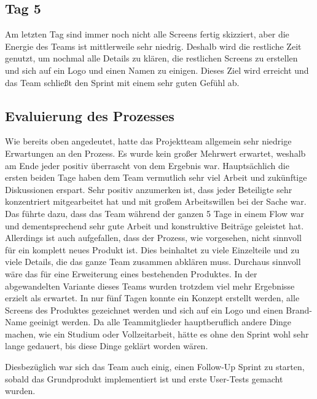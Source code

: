 \subsection*{Tag 5}
Am letzten Tag sind immer noch nicht alle Screens fertig skizziert, aber die Energie des Teams ist mittlerweile sehr niedrig. Deshalb wird die restliche Zeit genutzt, um nochmal alle Details zu klären, die restlichen Screens zu erstellen und sich auf ein Logo und einen Namen zu einigen. Dieses Ziel wird erreicht und das Team schließt den Sprint mit einem sehr guten Gefühl ab.


\subsection*{Evaluierung des Prozesses}
Wie bereits oben angedeutet, hatte das Projektteam allgemein sehr niedrige Erwartungen an den Prozess. Es wurde kein großer Mehrwert erwartet, weshalb am Ende jeder positiv überrascht von dem Ergebnis war. Hauptsächlich die ersten beiden Tage haben dem Team vermutlich sehr viel Arbeit und zukünftige Diskussionen erspart. Sehr positiv anzumerken ist, dass jeder Beteiligte sehr konzentriert mitgearbeitet hat und mit großem Arbeitswillen bei der Sache war. Das führte dazu, dass das Team während der ganzen 5 Tage in einem Flow war und dementsprechend sehr gute Arbeit und konstruktive Beiträge geleistet hat. Allerdings ist auch aufgefallen, dass der Prozess, wie vorgesehen, nicht sinnvoll für ein komplett neues Produkt ist. Dies beinhaltet zu viele Einzelteile und zu viele Details, die das ganze Team zusammen abklären muss. Durchaus sinnvoll wäre das für eine Erweiterung eines bestehenden Produktes. In der abgewandelten Variante dieses Teams wurden trotzdem viel mehr Ergebnisse erzielt als erwartet. In nur fünf Tagen konnte ein Konzept erstellt werden, alle Screens des Produktes gezeichnet werden und sich auf ein Logo und einen Brand-Name geeinigt werden. Da alle Teammitglieder hauptberuflich andere Dinge machen, wie ein Studium oder Vollzeitarbeit, hätte es ohne den Sprint wohl sehr lange gedauert, bis diese Dinge geklärt worden wären.

Diesbezüglich war sich das Team auch einig, einen Follow-Up Sprint zu starten, sobald das Grundprodukt implementiert ist und erste User-Tests gemacht wurden.
